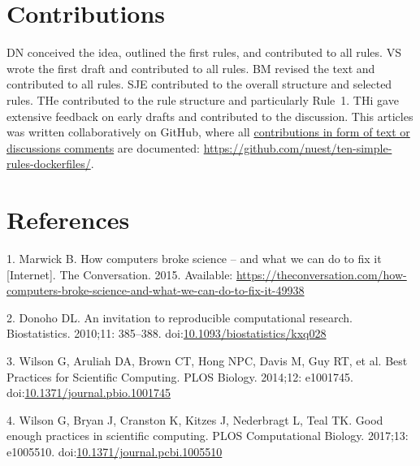 \documentclass[10pt,letterpaper]{article}
\begin{document}
\hypertarget{contributions}{%
\section*{Contributions}\label{contributions}}

DN conceived the idea, outlined the first rules, and contributed to all
rules. VS wrote the first draft and contributed to all rules. BM revised
the text and contributed to all rules. SJE contributed to the overall
structure and selected rules. THe contributed to the rule structure and
particularly Rule~1. THi gave extensive feedback on early drafts and
contributed to the discussion. This articles was written collaboratively
on GitHub, where all
\href{https://github.com/nuest/ten-simple-rules-dockerfiles/graphs/contributors}{contributions
in form of text or discussions comments} are documented:
\url{https://github.com/nuest/ten-simple-rules-dockerfiles/}.

\hypertarget{references}{%
\section*{References}\label{references}}

\hypertarget{refs}{}
\leavevmode\hypertarget{ref-marwick_how_2015}{}%
1. Marwick B. How computers broke science -- and what we can do to fix
it {[}Internet{]}. The Conversation. 2015. Available:
\url{https://theconversation.com/how-computers-broke-science-and-what-we-can-do-to-fix-it-49938}

\leavevmode\hypertarget{ref-donoho_invitation_2010}{}%
2. Donoho DL. An invitation to reproducible computational research.
Biostatistics. 2010;11: 385--388.
doi:\href{https://doi.org/10.1093/biostatistics/kxq028}{10.1093/biostatistics/kxq028}

\leavevmode\hypertarget{ref-wilson_best_2014}{}%
3. Wilson G, Aruliah DA, Brown CT, Hong NPC, Davis M, Guy RT, et al.
Best Practices for Scientific Computing. PLOS Biology. 2014;12:
e1001745.
doi:\href{https://doi.org/10.1371/journal.pbio.1001745}{10.1371/journal.pbio.1001745}

\leavevmode\hypertarget{ref-wilson_good_2017}{}%
4. Wilson G, Bryan J, Cranston K, Kitzes J, Nederbragt L, Teal TK. Good
enough practices in scientific computing. PLOS Computational Biology.
2017;13: e1005510.
doi:\href{https://doi.org/10.1371/journal.pcbi.1005510}{10.1371/journal.pcbi.1005510}
\end{document}
